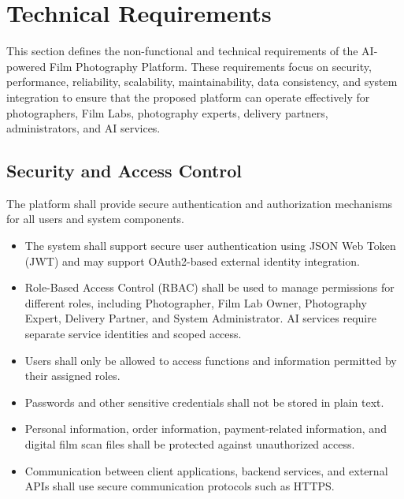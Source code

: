 
\section{Technical Requirements}

This section defines the non-functional and technical requirements of the
AI-powered Film Photography Platform. These requirements focus on security,
performance, reliability, scalability, maintainability, data consistency,
and system integration to ensure that the proposed platform can operate
effectively for photographers, Film Labs, photography experts, delivery
partners, administrators, and AI services.

\subsection{Security and Access Control}

The platform shall provide secure authentication and authorization mechanisms
for all users and system components.

\begin{itemize}
    \item The system shall support secure user authentication using JSON Web
    Token (JWT) and may support OAuth2-based external identity integration.

    \item Role-Based Access Control (RBAC) shall be used to manage permissions
    for different roles, including Photographer, Film Lab Owner,
    Photography Expert, Delivery Partner, and System Administrator.
    AI services require separate service identities and scoped access.

    \item Users shall only be allowed to access functions and information
    permitted by their assigned roles.

    \item Passwords and other sensitive credentials shall not be stored
    in plain text.

    \item Personal information, order information, payment-related information,
    and digital film scan files shall be protected against unauthorized access.

    \item Communication between client applications, backend services,
    and external APIs shall use secure communication protocols such as HTTPS.
\end{itemize}

